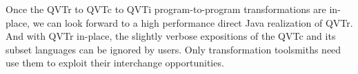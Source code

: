 Once the QVTr to QVTc to QVTi program-to-program transformations are in-place, we can look forward to a high performance direct Java realization of QVTr. And with QVTr in-place, the slightly verbose expositions of the QVTc and its subset languages can be ignored by users. Only transformation toolsmiths need use them to exploit their interchange opportunities.




